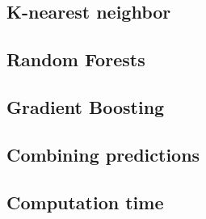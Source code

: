 \subsection{K-nearest neighbor}

\subsection{Random Forests}

\subsection{Gradient Boosting}

\subsection{Combining predictions}

\subsection{Computation time}
